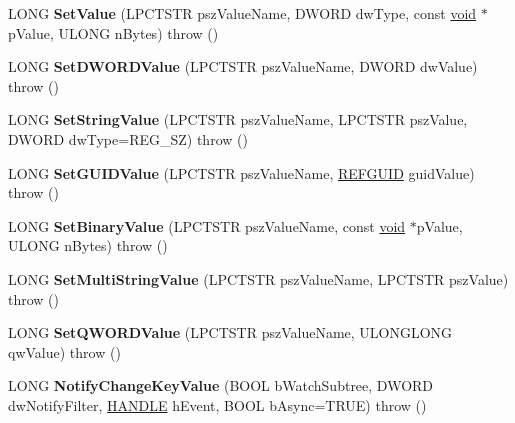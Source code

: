 \begin{DoxyCompactItemize}
L\+O\+NG {\bfseries Set\+Value} (L\+P\+C\+T\+S\+TR psz\+Value\+Name, D\+W\+O\+RD dw\+Type, const \hyperlink{interfacevoid}{void} $\ast$p\+Value, U\+L\+O\+NG n\+Bytes)  throw ()
\item 
\mbox{\label{class_a_t_l_1_1_c_reg_key_a7c0f973dc8f34629188263ccd2dc27ae}} 
L\+O\+NG {\bfseries Set\+D\+W\+O\+R\+D\+Value} (L\+P\+C\+T\+S\+TR psz\+Value\+Name, D\+W\+O\+RD dw\+Value)  throw ()
\item 
\mbox{\label{class_a_t_l_1_1_c_reg_key_ac54927a1990dcb78f9e01a81b1361c59}} 
L\+O\+NG {\bfseries Set\+String\+Value} (L\+P\+C\+T\+S\+TR psz\+Value\+Name, L\+P\+C\+T\+S\+TR psz\+Value, D\+W\+O\+RD dw\+Type=R\+E\+G\+\_\+\+SZ)  throw ()
\item 
\mbox{\label{class_a_t_l_1_1_c_reg_key_ad3c8381d5c9f49433122d68452fbf9b2}} 
L\+O\+NG {\bfseries Set\+G\+U\+I\+D\+Value} (L\+P\+C\+T\+S\+TR psz\+Value\+Name, \hyperlink{struct___g_u_i_d}{R\+E\+F\+G\+U\+ID} guid\+Value)  throw ()
\item 
\mbox{\label{class_a_t_l_1_1_c_reg_key_ada71df50baa173127e0277979121016e}} 
L\+O\+NG {\bfseries Set\+Binary\+Value} (L\+P\+C\+T\+S\+TR psz\+Value\+Name, const \hyperlink{interfacevoid}{void} $\ast$p\+Value, U\+L\+O\+NG n\+Bytes)  throw ()
\item 
\mbox{\label{class_a_t_l_1_1_c_reg_key_a90dfba35ad6bf996bcf6968c01c1ee76}} 
L\+O\+NG {\bfseries Set\+Multi\+String\+Value} (L\+P\+C\+T\+S\+TR psz\+Value\+Name, L\+P\+C\+T\+S\+TR psz\+Value)  throw ()
\item 
\mbox{\label{class_a_t_l_1_1_c_reg_key_ac63bdb874b1a884a0b4b6d3ba8661238}} 
L\+O\+NG {\bfseries Set\+Q\+W\+O\+R\+D\+Value} (L\+P\+C\+T\+S\+TR psz\+Value\+Name, U\+L\+O\+N\+G\+L\+O\+NG qw\+Value)  throw ()
\item 
\mbox{\label{class_a_t_l_1_1_c_reg_key_a461a1e83a7c79d69bd19b1ff388d4897}} 
L\+O\+NG {\bfseries Notify\+Change\+Key\+Value} (B\+O\+OL b\+Watch\+Subtree, D\+W\+O\+RD dw\+Notify\+Filter, \hyperlink{interfacevoid}{H\+A\+N\+D\+LE} h\+Event, B\+O\+OL b\+Async=T\+R\+UE)  throw ()
\item 

\end{DoxyCompactItemize}
